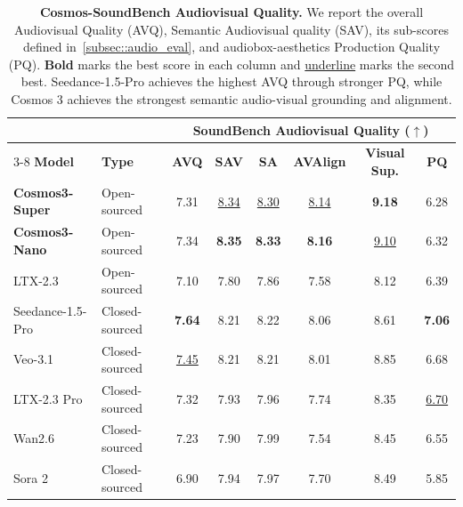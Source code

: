 \begin{table}[t]
    \centering
    \captionsetup{justification=raggedright, singlelinecheck=false}
    \caption{\textbf{Cosmos-SoundBench Audiovisual Quality.}
    We report the overall Audiovisual Quality (AVQ), Semantic Audiovisual quality (SAV), its sub-scores defined in~\cref{subsec::audio_eval}, and audiobox-aesthetics Production Quality (PQ).
    \textbf{Bold} marks the best score in each column and \underline{underline} marks the second best.
    Seedance-1.5-Pro achieves the highest AVQ through stronger PQ, while Cosmos 3 achieves the strongest semantic audio-visual grounding and alignment.}
    \label{tab:cosmos_soundbench_results}
    \footnotesize
    \setlength{\tabcolsep}{4pt}
    \renewcommand{\arraystretch}{1.15}
    \begin{tabular}{l l | cccccc}
        \toprule
        & & \multicolumn{6}{c}{\textbf{SoundBench Audiovisual Quality ($\uparrow$)}} \\
        \cmidrule(lr){3-8}
        \textbf{Model} & \textbf{Type} & \textbf{AVQ} & \textbf{SAV} & \textbf{SA} & \textbf{AVAlign} & \textbf{Visual Sup.} & \textbf{PQ}\\
        \midrule
        \rowcolor{rowours}
        \textbf{Cosmos3-Super} & Open-sourced & 7.31 & \underline{8.34} & \underline{8.30} &
  \underline{8.14} & \textbf{9.18} & 6.28 \\
          \rowcolor{rowours}
          \textbf{Cosmos3-Nano} & Open-sourced & 7.34 & \textbf{8.35} & \textbf{8.33} &
  \textbf{8.16} & \underline{9.10} & 6.32 \\
          \midrule
          LTX-2.3 & Open-sourced & 7.10 & 7.80 & 7.86 & 7.58 & 8.12 & 6.39\\
          \midrule
          Seedance-1.5-Pro & Closed-sourced & \textbf{7.64} & 8.21 & 8.22 & 8.06 & 8.61  & \textbf{7.06} \\
          Veo-3.1 & Closed-sourced & \underline{7.45} & 8.21 & 8.21 & 8.01 & 8.85 & 6.68 \\
          LTX-2.3 Pro & Closed-sourced & 7.32 & 7.93 & 7.96 & 7.74 & 8.35 & \underline{6.70} \\
          Wan2.6 & Closed-sourced & 7.23 & 7.90 & 7.99 & 7.54 & 8.45 & 6.55 \\
          Sora 2 & Closed-sourced & 6.90 & 7.94 & 7.97 & 7.70 & 8.49 & 5.85 \\
        \bottomrule
    \end{tabular}
\end{table}
